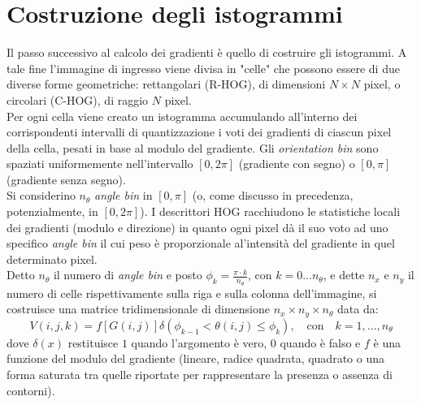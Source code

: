 \section{Costruzione degli istogrammi}
Il passo successivo al calcolo dei gradienti è quello di costruire gli istogrammi. A tale fine l'immagine di ingresso viene divisa in "celle" che possono essere di due diverse forme geometriche: rettangolari (R-HOG), di dimensioni $N\times N $ pixel, o circolari (C-HOG), di raggio $N$ pixel.\\
Per ogni cella viene creato un istogramma accumulando all'interno dei corrispondenti intervalli di quantizzazione i voti dei gradienti di ciascun pixel della cella, pesati in base al modulo del gradiente. 
Gli \emph{orientation bin} sono spaziati uniformemente nell'intervallo $[0, 2\pi]$ (gradiente con segno) o $[0, \pi]$ (gradiente senza segno).\\ 
Si considerino $n_{\theta}$ \emph{angle bin} in $[0,\pi]$ (o, come discusso in precedenza, potenzialmente, in $[0,2\pi]$).
I descrittori HOG racchiudono le statistiche locali dei gradienti (modulo e direzione) in quanto ogni pixel dà il suo voto ad uno specifico \emph{angle bin} il cui peso è proporzionale al'intensità del gradiente in quel determinato pixel. 
\\
Detto $ n_{\theta}$ il numero di \emph{angle bin} e posto ${\phi_{k}}={\frac{\pi\cdot k}{n_{\theta}}}$, con $k=0...n_{\theta}$, e dette $n_{x}$ e $n_{y}$ il numero di celle rispettivamente sulla riga e sulla colonna dell'immagine, si costruisce una matrice tridimensionale di dimensione $n_{x}\times n_{y} \times n_{\theta}$ data da:
\begin{equation}
\label{eq:euquazione_matrice_voti}
V(i,j,k)=f\left [G(i,j)\right ]\delta(\phi_{k-1} <\theta(i,j) \leq\phi_{k}), \quad \text{con} \quad k=1,\ldots,n_{\theta}
\end{equation}
dove $ \delta(x)$ restituisce $1$ quando l'argomento è vero, $0$ quando è falso e $f$ è una funzione del modulo del gradiente (lineare, radice quadrata, quadrato o una forma saturata tra quelle riportate per rappresentare la presenza o assenza di contorni).


